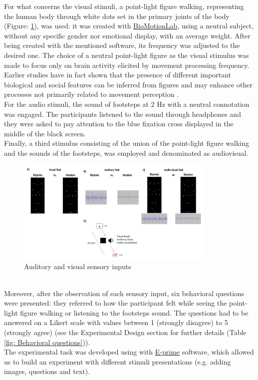 For what concerns the visual stimuli, a point-light figure walking, representing the human body through white dots set in the primary joints of the body (Figure: \ref{fig: visual stimuli}), was used: it was created with \href{https://www.biomotionlab.ca/html5-bml-walker/}{BioMotionLab}, using a neutral subject, without any specific gender nor emotional display, with an average weight. After being created with the mentioned software, its frequency was adjusted to the desired one. The choice of a neutral point-light figure as the visual stimulus was made to focus only on brain activity elicited by movement processing frequency. Earlier studies have in fact shown that the presence of different important biological and social features can be inferred from figures and may enhance other processes not primarily related to movement perception \parencite{Cracco_2022}. \\
For the audio stimuli, the sound of footsteps at 2 Hz with a neutral connotation was engaged. The participants listened to the sound through headphones and they were asked to pay attention to the blue fixation cross displayed in the middle of the black screen. \\
Finally, a third stimulus consisting of the union of the point-light figure walking and the sounds of the footsteps, was employed and denominated as audiovisual. 
\begin{figure}[h]
    \centering
        \includegraphics[width=0.85\textwidth]{appendix/Picture 1.png}
        \caption{Auditory and visual sensory inputs}
        \label{fig: visual stimuli}
\end{figure} \\
Moreover, after the observation of each sensory input, six behavioral questions were presented: they referred to how the participant felt while seeing the point-light figure walking or listening to the footsteps sound. The questions had to be answered on a Likert scale with values between 1 (strongly disagree) to 5 (strongly agree) (see the Experimental Design section for further details (Table \ref{fig: Behavioral questions})). \\
The experimental task was developed using with \href{https://pstnet.com/products/e-prime/}{E-prime} software, which allowed us to build an experiment with different stimuli presentations (e.g. adding images, questions and text).

